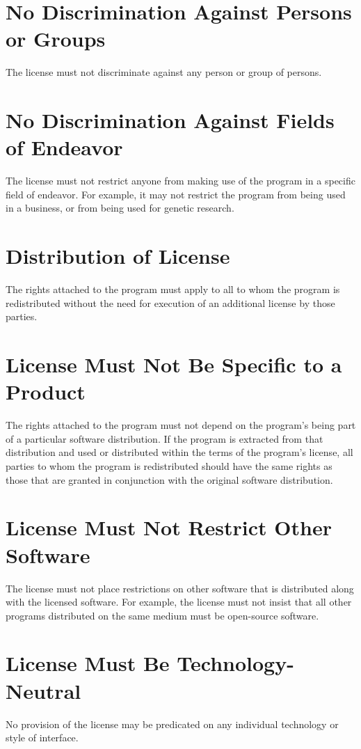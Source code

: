 \section{No Discrimination Against Persons or Groups}
The license must not discriminate against any person or group of persons.

\section{No Discrimination Against Fields of Endeavor}
The license must not restrict anyone from making use of the program in a specific field of endeavor. For example, it may not restrict the program from being used in a business, or from being used for genetic research.

\section{Distribution of License}
The rights attached to the program must apply to all to whom the program is redistributed without the need for execution of an additional license by those parties.

\section{License Must Not Be Specific to a Product}
The rights attached to the program must not depend on the program's being part of a particular software distribution. If the program is extracted from that distribution and used or distributed within the terms of the program's license, all parties to whom the program is redistributed should have the same rights as those that are granted in conjunction with the original software distribution.

\section{License Must Not Restrict Other Software}
The license must not place restrictions on other software that is distributed along with the licensed software. For example, the license must not insist that all other programs distributed on the same medium must be open-source software.

\section{License Must Be Technology-Neutral}
No provision of the license may be predicated on any individual technology or style of interface.